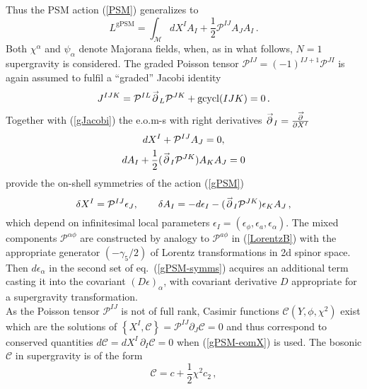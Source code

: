 \documentclass[a4paper,10pt]{article}
\newcommand{\half}{\frac{1}{2}}
\newcommand{\gcycl}{\operatorname{gcycl}}
\newcommand{\BMf}{\mathcal{M}}
\newcommand{\Poisson}{\mathcal{P}}
\newcommand{\casimir}{c}
\renewcommand{\^}{{}^}
\renewcommand{\_}{\!{}_}
\newcommand{\rvec}[1]{\overset{\,
    \raisebox{-0.5ex}{$\scriptscriptstyle \rightarrow$}}{#1}{}}
\newcommand{\rpartial}{\rvec{\partial}}
\begin{document}
Thus the PSM action (\ref{PSM}) generalizes to
\begin{equation}
  \label{gPSM}
  L^\mathrm{gPSM} = \int_\BMf dX^I A_I + \half \Poisson^{IJ} A_J 
  A_I\, .
\end{equation}
Both $\chi^\alpha$ and $\psi_\alpha$ denote Majorana fields, 
when, as in what follows, $N=1$ supergravity is considered. 
The graded Poisson tensor $\mathcal{P}^{IJ} = (-1)^{IJ+1} 
\mathcal{P}^{JI}$ is again assumed to fulfil a ``graded'' Jacobi 
identity 
\begin{equation}
  J^{IJK} = \Poisson^{IL} \rpartial_L \Poisson^{JK} + \gcycl(IJK) 
  = 0 \, .
  \label{gJacobi} 
\end{equation}
Together with (\ref{gJacobi}) the e.o.m-s with right derivatives 
$\rvec{\partial}_I = \frac{\rpartial}{\partial X^I}$
\begin{gather}
  dX^I + \Poisson^{IJ} A_J = 0, \label{gPSM-eomX} \\
  dA_I + \half (\rpartial_I \Poisson^{JK}) A_K A_J = 0
  \label{gPSM-eomA}
\end{gather}
provide the on-shell symmetries of the action (\ref{gPSM}) 
\begin{equation}
  \label{gPSM-symms}
  \delta X^I = \Poisson^{IJ} \epsilon_J, \qquad
  \delta A_I = -d\epsilon_I - (\rpartial_I \Poisson^{JK}) \epsilon_K 
  A_J\, ,
\end{equation}
which depend on infinitesimal local parameters $\epsilon_I = 
(\epsilon_\phi, \epsilon_a, \epsilon_\alpha)$. The mixed 
components $\mathcal{P}^{\alpha\phi} $ are constructed by 
analogy to $\mathcal{P}^{a\phi}$ in (\ref{LorentzB}) 
with the appropriate 
generator $(-\gamma_5/2)$ of Lorentz transformations in 2d 
spinor space. Then $d\epsilon_\alpha$ in the second set of 
eq.\ (\ref{gPSM-symms}) acquires an additional term casting it into the 
covariant $(D\epsilon )_\alpha$, with covariant derivative 
$D$  appropriate for a supergravity transformation. \\
As the Poisson tensor $\mathcal{P}^{IJ}$ is not of full 
rank, Casimir functions $\mathcal{C} (Y,\phi,\chi^2)$ exist 
which are the solutions of $\left\{ X^I, \mathcal{C} 
\right\} = \mathcal{P}^{IJ} \partial_J \mathcal{C} = 0$ and 
thus correspond to conserved quantities $d \mathcal{C} = 
dX^I\, \partial_I \mathcal{C} = 0$ when (\ref{gPSM-eomX}) is used.   
The bosonic $\mathcal{C}$ in  supergravity is of the form 
\begin{equation}
  \label{Casimir}
  \mathcal{C} = \casimir + \half \chi^2 \casimir_2\, ,
\end{equation}
\end{document}
